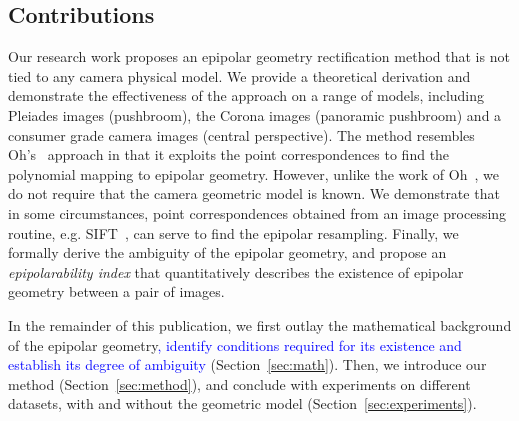 \documentclass{ipol}
\newcommand{\ChangeMPD}[2]{\textcolor{blue}{#2}}
\begin{document}
 


 


\subsection{Contributions}
Our research work proposes an epipolar geometry rectification method that is not tied to any camera physical model. %
We provide a theoretical derivation and demonstrate the effectiveness of the approach on a range of models, including Pleiades images (pushbroom), the Corona images (panoramic pushbroom) and a consumer grade camera images (central perspective).
The method resembles Oh's~\cite{Oh2011} approach in that it exploits the point correspondences to find the polynomial mapping to epipolar geometry. However, unlike the work of Oh~\cite{Oh2011}, we do not require that the camera geometric model is known. We demonstrate that in some circumstances, point correspondences obtained from an image processing routine, e.g. SIFT~\cite{lowe2004distinctive}, can serve to find the epipolar resampling. 
Finally, we formally derive the ambiguity of the epipolar geometry, and propose an \textit{epipolarability index} that quantitatively describes the existence of epipolar geometry between a pair of images.

In the remainder of this publication, we first outlay the mathematical background of the epipolar geometry\ChangeMPD{ and identify cases when epipolar geometry does not exist or is ambiguous}{, identify conditions required for its existence and establish its degree of ambiguity}  (Section~\ref{sec:math}). Then, we introduce our method (Section~\ref{sec:method}), and conclude with experiments on different datasets, with and without the geometric model (Section~\ref{sec:experiments}). 
 
\end{document}
